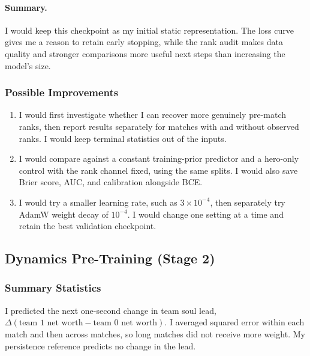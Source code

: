 \documentclass[11pt]{article}
\begin{document}
    \paragraph{Summary.}
    I would keep this checkpoint as my initial static representation. The loss
    curve gives me a reason to retain early stopping, while the rank audit makes
    data quality and stronger comparisons more useful next steps than increasing
    the model's size.

\subsubsection{Possible Improvements}
    \begin{enumerate}
        \item I would first investigate whether I can recover more genuinely
        pre-match ranks, then report results separately for matches with and
        without observed ranks. I would keep terminal statistics out of the inputs.
        \item I would compare against a constant training-prior predictor and
        a hero-only control with the rank channel fixed, using the same splits.
        I would also save Brier score, AUC, and calibration alongside BCE.
        \item I would try a smaller learning rate, such as $3\times10^{-4}$,
        then separately try AdamW weight decay of $10^{-4}$. I would change one
        setting at a time and retain the best validation checkpoint.
    \end{enumerate}

\subsection{Dynamics Pre-Training (Stage 2)}
\subsubsection{Summary Statistics}
    I predicted the next one-second change in team soul lead,
    $\Delta(\text{team 1 net worth}-\text{team 0 net worth})$.
    I averaged squared error within each match and then across matches, so long
    matches did not receive more weight. My persistence reference predicts no
    change in the lead.
\end{document}
